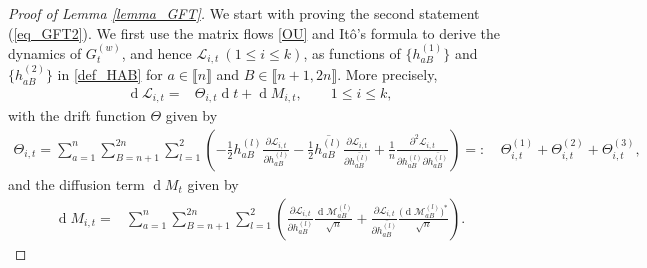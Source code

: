 \documentclass[10pt,reqno]{amsart}
\numberwithin{equation}{section}
\numberwithin{figure}{section}
\theoremstyle{plain}
\newcommand{\<}{\langle}
\renewcommand{\>}{\rangle}
\newcommand{\dd}{\operatorname{d}\!{}}
\newcommand{\II}{\mathcal{L}_{i,t}}
\begin{document}
\begin{proof}[Proof of Lemma \ref{lemma_GFT}]
    

	\medskip
	
	
	 We start with proving the second statement (\ref{eq_GFT2}).  We first use the matrix flows \eqref{OU} and Itô's formula to derive the dynamics of $G^{(w)}_t$, and hence $\II~(1\leq i\leq k)$, as functions of $\big\{h^{(1)}_{aB}\big\}$ and $\big\{h^{(2)}_{aB}\big\}$ in \eqref{def_HAB} for $a\in 
	\llbracket n \rrbracket$ and $B\in \llbracket n+1,2n \rrbracket$. More precisely, 
	\begin{align}\label{eq_dynamics}
		\dd \II=& \Theta_{i,t} \dd t+  \dd M_{i,t}, \qquad 1\leq i\leq k,
	\end{align}
	with the drift function $\Theta$ given by
	\begin{align}\label{eq_drift}
		\Theta_{i,t} =   \sum_{a=1}^n \sum_{B=n+1}^{2n} \sum_{l=1}^2 \left(-\frac{1}{2}  h^{(l)}_{aB} \frac{  \partial \II}{\partial h^{(l)}_{aB}}  -\frac{1}{2} \overline{h^{(l)}_{aB}} \frac{\partial \II}{\partial \overline{h^{(l)}_{aB}}}  + \frac{1}{n} \frac{\partial^2 \II}{\partial h^{(l)}_{aB} \partial  \overline{h^{(l)}_{aB}}} \right)
		=:&~\Theta^{(1)}_{i,t}+\Theta^{(2)}_{i,t}+\Theta^{(3)}_{i,t},
	\end{align}
	and the diffusion term $\dd M_t$ given by
	\begin{align}\label{eq_diffusion}
		\dd M_{i,t} =&\sum_{a=1}^n \sum_{B=n+1}^{2n} \sum_{l=1}^2  \left(\frac{ \partial \II}{\partial h^{(l)}_{aB}}  \frac{\dd\mathcal{M}^{(l)}_{aB}}{\sqrt{n}} + \frac{\partial \II}{\partial \overline{h^{(l)}_{aB}}} \frac{\big(\dd\mathcal{M}^{(l)}_{aB}\big)^*}{\sqrt{n}}  \right).
	\end{align}


\end{proof}
\end{document}
